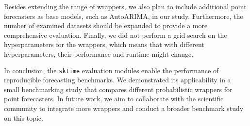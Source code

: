 Besides extending the range of wrappers, we also plan to include additional point forecasters as base models, such as AutoARIMA, in our study. Furthermore, the number of examined datasets should be expanded to provide a more comprehensive evaluation. Finally, we did not perform a grid search on the hyperparameters for the wrappers, which means that with different hyperparameters, their performance and runtime might change.

In conclusion, the \texttt{sktime} evaluation modules enable the performance of reproducible forecasting benchmarks. We demonstrated its applicability in a small benchmarking study that compares different probabilistic wrappers for point forecasters. In future work, we aim to collaborate with the scientific community to integrate more wrappers and conduct a broader benchmark study on this topic.



